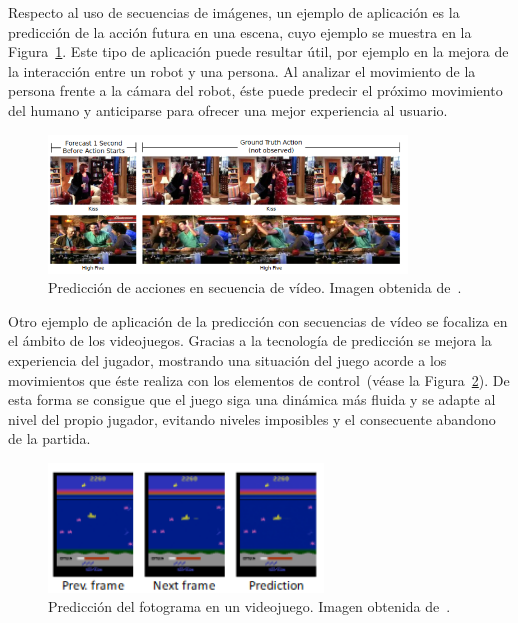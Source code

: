 Respecto al uso de secuencias de imágenes, un ejemplo de aplicación es la predicción de la acción futura en una escena, cuyo ejemplo se muestra en la Figura~\ref{fig.action}. Este tipo de aplicación puede resultar útil, por ejemplo en la mejora de la interacción entre un robot y una persona. Al analizar el movimiento de la persona frente a la cámara del robot, éste puede predecir el próximo movimiento del humano y anticiparse para ofrecer una mejor experiencia al usuario.
\vspace{10pt}
\begin{figure}[H]
	\begin{center}
		\includegraphics[width=0.85\textwidth]{ figures/intro/action.PNG}
		\caption{Predicción de acciones en secuencia de vídeo. Imagen obtenida de~\cite{unlabeledvideo}.
		}
		\label{fig.action}
	\end{center}
\end{figure}
\vspace{-10pt}
Otro ejemplo de aplicación de la predicción con secuencias de vídeo se focaliza en el ámbito de los videojuegos. Gracias a la tecnología de predicción se mejora la experiencia del jugador, mostrando una situación del juego acorde a los movimientos que éste realiza con los elementos de control~(véase la Figura~\ref{fig.game}). De esta forma se consigue que el juego siga una dinámica más fluida y se adapte al nivel del propio jugador, evitando niveles imposibles y el consecuente abandono de la partida.

\begin{figure}[H]
	\begin{center}
		\includegraphics[width=0.65\textwidth]{ figures/intro/game.PNG}
		\caption{Predicción del fotograma en un videojuego. Imagen obtenida de~\cite{actiongames}.
		}
		\label{fig.game}
	\end{center}
\end{figure}
\vspace{-10pt}

